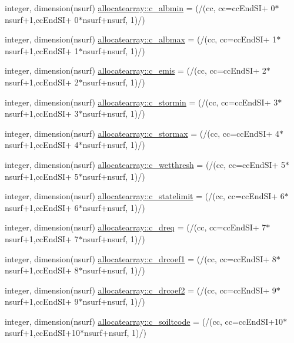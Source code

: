 \begin{DoxyCompactItemize}
integer, dimension(nsurf) \hyperlink{namespaceallocatearray_a91ee5bc5a0b80fc80743025448cf3317}{allocatearray\+::c\+\_\+albmin} = (/(cc, cc=cc\+End\+SI+ 0$\ast$nsurf+1,cc\+End\+SI+ 0$\ast$nsurf+nsurf, 1)/)
\item 
integer, dimension(nsurf) \hyperlink{namespaceallocatearray_af832f9ed003852e1fcd849c6de9196fd}{allocatearray\+::c\+\_\+albmax} = (/(cc, cc=cc\+End\+SI+ 1$\ast$nsurf+1,cc\+End\+SI+ 1$\ast$nsurf+nsurf, 1)/)
\item 
integer, dimension(nsurf) \hyperlink{namespaceallocatearray_aaf59aa57c3692da64fc1105b477d5f05}{allocatearray\+::c\+\_\+emis} = (/(cc, cc=cc\+End\+SI+ 2$\ast$nsurf+1,cc\+End\+SI+ 2$\ast$nsurf+nsurf, 1)/)
\item 
integer, dimension(nsurf) \hyperlink{namespaceallocatearray_a56107e49d611ea80b3d07961c776361f}{allocatearray\+::c\+\_\+stormin} = (/(cc, cc=cc\+End\+SI+ 3$\ast$nsurf+1,cc\+End\+SI+ 3$\ast$nsurf+nsurf, 1)/)
\item 
integer, dimension(nsurf) \hyperlink{namespaceallocatearray_aa6246aa1e26939ed7e752b7722b0be8c}{allocatearray\+::c\+\_\+stormax} = (/(cc, cc=cc\+End\+SI+ 4$\ast$nsurf+1,cc\+End\+SI+ 4$\ast$nsurf+nsurf, 1)/)
\item 
integer, dimension(nsurf) \hyperlink{namespaceallocatearray_aef6324b6203130643705c7932a3c2d1a}{allocatearray\+::c\+\_\+wetthresh} = (/(cc, cc=cc\+End\+SI+ 5$\ast$nsurf+1,cc\+End\+SI+ 5$\ast$nsurf+nsurf, 1)/)
\item 
integer, dimension(nsurf) \hyperlink{namespaceallocatearray_a3b5275837de2a17f3a3529a9a5a38434}{allocatearray\+::c\+\_\+statelimit} = (/(cc, cc=cc\+End\+SI+ 6$\ast$nsurf+1,cc\+End\+SI+ 6$\ast$nsurf+nsurf, 1)/)
\item 
integer, dimension(nsurf) \hyperlink{namespaceallocatearray_af742d3cef3891253138814e948cfcaa8}{allocatearray\+::c\+\_\+dreq} = (/(cc, cc=cc\+End\+SI+ 7$\ast$nsurf+1,cc\+End\+SI+ 7$\ast$nsurf+nsurf, 1)/)
\item 
integer, dimension(nsurf) \hyperlink{namespaceallocatearray_afb48307997ff358fb5efa3ed4bafa42e}{allocatearray\+::c\+\_\+drcoef1} = (/(cc, cc=cc\+End\+SI+ 8$\ast$nsurf+1,cc\+End\+SI+ 8$\ast$nsurf+nsurf, 1)/)
\item 
integer, dimension(nsurf) \hyperlink{namespaceallocatearray_a46a4f5cd68febccee03e1360787b9e78}{allocatearray\+::c\+\_\+drcoef2} = (/(cc, cc=cc\+End\+SI+ 9$\ast$nsurf+1,cc\+End\+SI+ 9$\ast$nsurf+nsurf, 1)/)
\item 
integer, dimension(nsurf) \hyperlink{namespaceallocatearray_acb3f02c069d894cd2ddc73a5e4f0b1b5}{allocatearray\+::c\+\_\+soiltcode} = (/(cc, cc=cc\+End\+SI+10$\ast$nsurf+1,cc\+End\+SI+10$\ast$nsurf+nsurf, 1)/)

\end{DoxyCompactItemize}
